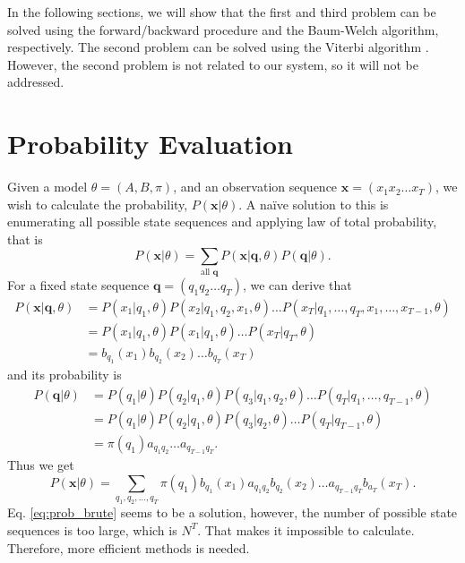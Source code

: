 \documentclass[12pt,final,twoside]{report}
\theoremstyle{plain}
\theoremstyle{definition}
\theoremstyle{remark}
\begin{document}
In the following sections, we will show that the first and third problem can be solved using the forward/backward procedure and the Baum-Welch algorithm, respectively. The second problem can be solved using the Viterbi algorithm \cite{forney_viterbi_1973}. However, the second problem is not related to our system, so it will not be addressed.

\section{Probability Evaluation}
Given a model $\theta=(A, B, \pi)$, and an observation sequence $\mathbf{x} = (x_1 x_2 \dots x_T)$, we wish to calculate the probability, $P(\mathbf{x}|\theta)$. A na\"ive solution to this is enumerating all possible state sequences and applying law of total probability, that is
\begin{equation}
  P(\mathbf{x}|\theta) = \sum_{\text{all } \mathbf{q}} P(\mathbf{x}|\mathbf{q},\theta) P(\mathbf{q}|\theta) .
\end{equation}
For a fixed state sequence $\mathbf{q} = (q_1 q_2 \dots q_T)$, we can derive that
\begin{align}
  P(\mathbf{x}|\mathbf{q},\theta) &= P(x_1|q_1,\theta) P(x_2|q_1,q_2,x_1,\theta) \dots P(x_T|q_1,\dots,q_T,x_1,\dots,x_{T-1},\theta) \\
  &= P(x_1|q_1, \theta) P(x_1|q_1, \theta) \dots P(x_T|q_T, \theta) \\
  &= b_{q_1}(x_1) b_{q_2}(x_2) \dots b_{q_T}(x_T)
\end{align}
and its probability is
\begin{align}
  P(\mathbf{q}|\theta) &= P(q_1|\theta) P(q_2|q_1,\theta) P(q_3|q_1,q_2,\theta) \dots P(q_T|q_1,\dots,q_{T-1},\theta) \\
  &= P(q_1|\theta) P(q_2|q_1,\theta) P(q_3|q_2,\theta) \dots P(q_T|q_{T-1},\theta)  \\
  &= \pi(q_1) a_{q_1q_2} \dots a_{q_{T-1}q_T} .
\end{align}
Thus we get 
\begin{equation} \label{eq:prob_brute}
  P(\mathbf{x}|\theta) = \sum_{q_1,q_2,\dots,q_T} \pi(q_1) b_{q_1}(x_1) a_{q_1q_2} b_{q_2}(x_2) \dots a_{q_{T-1}q_T} b_{a_T}(x_T) .
\end{equation}
Eq. \ref{eq:prob_brute} seems to be a solution, however, the number of possible state sequences is too large, which is $N^T$. That makes it impossible to calculate. Therefore, more efficient methods is needed.
\end{document}
